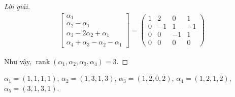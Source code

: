 \begin{proof}[Lời giải]
\begin{align*}
\begin{bmatrix}
            \alpha_{1}                            \\
            \alpha_{2} - \alpha_{1}               \\
            \alpha_{3} - 2\alpha_{2} + \alpha_{1} \\
            \alpha_{4} + \alpha_{3} -\alpha_{2} - \alpha_{1}
        \end{bmatrix}=
        \begin{pmatrix}
            1 & 2  & 0  & 1  \\
            0 & -1 & 1  & -1 \\
            0 & 0  & -1 & 1  \\
            0 & 0  & 0  & 0
        \end{pmatrix}
    \end{align*}
    \par Như vậy, $\operatorname{rank}(\alpha_{1},\alpha_{2},\alpha_{3},\alpha_{4}) = 3$.
\end{proof}

\begin{exercise}
    $\alpha_{1} = (1,1,1,1)$, $\alpha_{2} = (1,3,1,3)$, $\alpha_{3} = (1,2,0,2)$, $\alpha_{4} = (1,2,1,2)$, $\alpha_{5} = (3,1,3,1)$.
\end{exercise}

